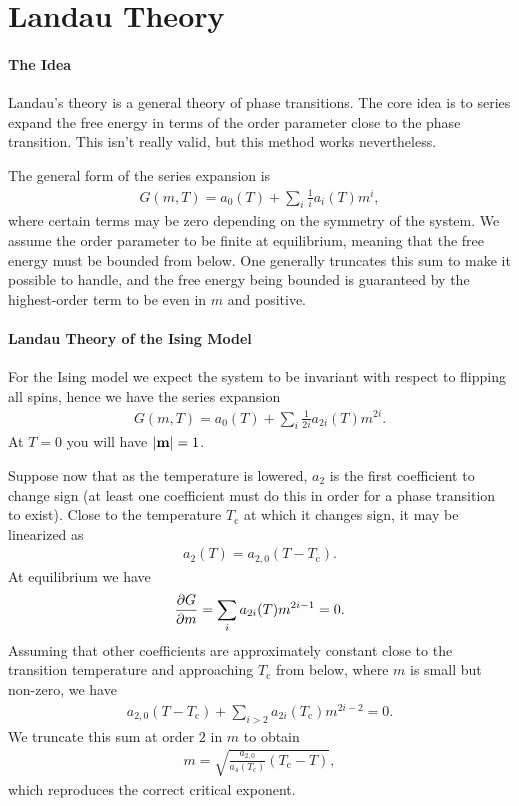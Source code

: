 \section{Landau Theory}

\paragraph{The Idea}
Landau's theory is a general theory of phase transitions. The core idea is to series expand the free energy in terms of the order parameter close to the phase transition. This isn't really valid, but this method works nevertheless.

The general form of the series expansion is
\begin{align*}
	G(m, T) = a_{0}(T) + \sum\limits_{i}\frac{1}{i}a_{i}(T)m^{i},
\end{align*}
where certain terms may be zero depending on the symmetry of the system. We assume the order parameter to be finite at equilibrium, meaning that the free energy must be bounded from below. One generally truncates this sum to make it possible to handle, and the free energy being bounded is guaranteed by the highest-order term to be even in $m$ and positive.

\paragraph{Landau Theory of the Ising Model}
For the Ising model we expect the system to be invariant with respect to flipping all spins, hence we have the series expansion
\begin{align*}
	G(m, T) = a_{0}(T) + \sum\limits_{i}\frac{1}{2i}a_{2i}(T)m^{2i}.
\end{align*}
At $T = 0$ you will have $\abs{\vb{m}} = 1$.

Suppose now that as the temperature is lowered, $a_{2}$ is the first coefficient to change sign (at least one coefficient must do this in order for a phase transition to exist). Close to the temperature $T_{\text{c}}$ at which it changes sign, it may be linearized as
\begin{align*}
	a_{2}(T) = a_{2, 0}(T - T_{\text{c}}).
\end{align*}
At equilibrium we have
\begin{align*}
	\pdv{G}{m} = \sum\limits_{i}a_{2i}(T)m^{2i - 1} = 0.
\end{align*}
Assuming that other coefficients are approximately constant close to the transition temperature and approaching $T_{\text{c}}$ from below, where $m$ is small but non-zero, we have
\begin{align*}
	a_{2, 0}(T - T_{\text{c}}) + \sum\limits_{i > 2}a_{2i}(T_{\text{c}})m^{2i - 2} = 0.
\end{align*}
We truncate this sum at order $2$ in $m$ to obtain
\begin{align*}
	m = \sqrt{\frac{a_{2, 0}}{a_{4}(T_{\text{c}})}(T_{\text{c}} - T)},
\end{align*}
which reproduces the correct critical exponent.

